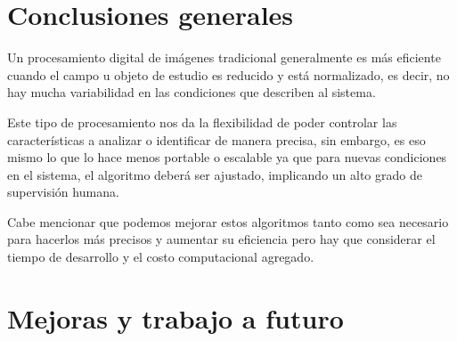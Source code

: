 \section{Conclusiones generales}
Un procesamiento digital de imágenes tradicional generalmente es más eficiente cuando el campo u objeto de estudio es reducido y está normalizado, es decir, no hay mucha variabilidad en las condiciones que describen al sistema.

Este tipo de procesamiento nos da la flexibilidad de poder controlar las características a analizar o identificar de manera precisa, sin embargo, es eso mismo lo que lo hace menos portable o escalable ya que para nuevas condiciones en el sistema, el algoritmo deberá ser ajustado, implicando un alto grado de supervisión humana.

Cabe mencionar que podemos mejorar estos algoritmos tanto como sea necesario para hacerlos más precisos y aumentar su eficiencia pero hay que considerar el tiempo de desarrollo y el costo computacional agregado.

\section{Mejoras y trabajo a futuro}

